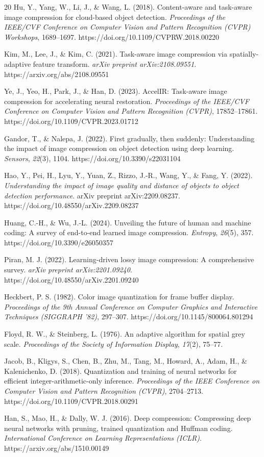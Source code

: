 \documentclass[12pt, a4paper]{article}
\begin{document}
\begin{thebibliography}{20}
Hu, Y., Yang, W., Li, J., \& Wang, L. (2018). Content-aware and task-aware image compression for cloud-based object detection. \textit{Proceedings of the IEEE/CVF Conference on Computer Vision and Pattern Recognition (CVPR) Workshops}, 1689–1697. https://doi.org/10.1109/CVPRW.2018.00220

Kim, M., Lee, J., \& Kim, C. (2021). Task-aware image compression via spatially-adaptive feature transform. \textit{arXiv preprint arXiv:2108.09551}. https://arxiv.org/abs/2108.09551

Ye, J., Yeo, H., Park, J., \& Han, D. (2023). AccelIR: Task-aware image compression for accelerating neural restoration. \textit{Proceedings of the IEEE/CVF Conference on Computer Vision and Pattern Recognition (CVPR)}, 17852–17861. https://doi.org/10.1109/CVPR.2023.01712

Gandor, T., \& Nalepa, J. (2022). First gradually, then suddenly: Understanding the impact of image compression on object detection using deep learning. \textit{Sensors}, \textit{22}(3), 1104. https://doi.org/10.3390/s22031104

Hao, Y., Pei, H., Lyu, Y., Yuan, Z., Rizzo, J.-R., Wang, Y., \& Fang, Y. (2022). \textit{Understanding the impact of image quality and distance of objects to object detection performance}. arXiv preprint arXiv:2209.08237. https://doi.org/10.48550/arXiv.2209.08237

Huang, C.-H., \& Wu, J.-L. (2024). Unveiling the future of human and machine coding: A survey of end-to-end learned image compression. \textit{Entropy}, \textit{26}(5), 357. https://doi.org/10.3390/e26050357

Piran, M. J. (2022). Learning-driven lossy image compression: A comprehensive survey. \textit{arXiv preprint arXiv:2201.09240}. https://doi.org/10.48550/arXiv.2201.09240

Heckbert, P. S. (1982). Color image quantization for frame buffer display. \textit{Proceedings of the 9th Annual Conference on Computer Graphics and Interactive Techniques (SIGGRAPH ’82)}, 297–307. https://doi.org/10.1145/800064.801294

Floyd, R. W., \& Steinberg, L. (1976). An adaptive algorithm for spatial grey scale. \textit{Proceedings of the Society of Information Display}, \textit{17}(2), 75–77.

Jacob, B., Kligys, S., Chen, B., Zhu, M., Tang, M., Howard, A., Adam, H., \& Kalenichenko, D. (2018). Quantization and training of neural networks for efficient integer-arithmetic-only inference. \textit{Proceedings of the IEEE Conference on Computer Vision and Pattern Recognition (CVPR)}, 2704–2713. https://doi.org/10.1109/CVPR.2018.00291

Han, S., Mao, H., \& Dally, W. J. (2016). Deep compression: Compressing deep neural networks with pruning, trained quantization and Huffman coding. \textit{International Conference on Learning Representations (ICLR)}. https://arxiv.org/abs/1510.00149

\end{thebibliography}
\end{document}
